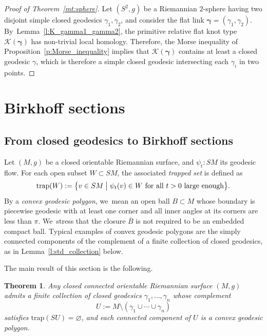 \documentclass[11pt]{article}
\let\bm\boldsymbol
\newcommand{\KK}{\mathcal{K}}
\newcommand{\trap}{\mathrm{trap}}
\theoremstyle{plain}
\newtheorem{Thm}{Theorem}[section]
\theoremstyle{definition}
\begin{document}
\begin{proof}[Proof of Theorem~\ref{mt:sphere}]
Let $(S^2,g)$ be a Riemannian $2$-sphere having two disjoint simple closed geodesics $\gamma_1,\gamma_2$, and consider the flat link $\bm\gamma=(\gamma_1,\gamma_2)$. By~Lemma~\ref{l:K_gamma1_gamma2}, the primitive relative flat knot type $\KK(\bm\gamma)$ has non-trivial local homology. Therefore, the Morse inequality of Proposition~\ref{p:Morse_inequality} implies that $\KK(\bm\gamma)$ contains at least a closed geodesic $\gamma$, which is therefore a simple closed geodesic intersecting each $\gamma_i$ in two points.
\end{proof}

\section{Birkhoff sections}
\label{s:Birkhoff_sections}

\subsection{From closed geodesics to Birkhoff sections}

Let $(M,g)$ be a closed orientable Riemannian surface, and $\psi_t:SM$ its geodesic flow. For each open subset $W\subset SM$, the associated \emph{trapped set} is defined as
\begin{align*}
\trap(W) := \bigl\{v\in SM\bigm| \psi_t(v)\in W\mbox{ for all $t>0$ large enough} \bigr\}.
\end{align*}
By a \emph{convex geodesic polygon}, we~mean an open ball $B\subset M$ whose boundary is piecewise geodesic with at least one corner and all inner angles at its corners are less than $\pi$. We~stress that the closure $\overline B$ is not required to be an embedded compact ball. Typical examples of convex geodesic polygons are the simply connected components of the complement of a finite collection of closed geodesics, as in Lemma~\ref{l:std_collection} below.

The main result of this section is the following.

\begin{Thm}\label{t:complete_system}
Any closed connected orientable Riemannian surface $(M,g)$ admits a finite collection of closed geodesics $\gamma_1,\dots,\gamma_n$ whose complement
\[
U:=M\setminus(\gamma_1\cup\cdots\cup\gamma_n)
\]
satisfies $\trap(SU)=\varnothing$, and each connected component of $U$ is a convex geodesic polygon.
\end{Thm}
\end{document}
